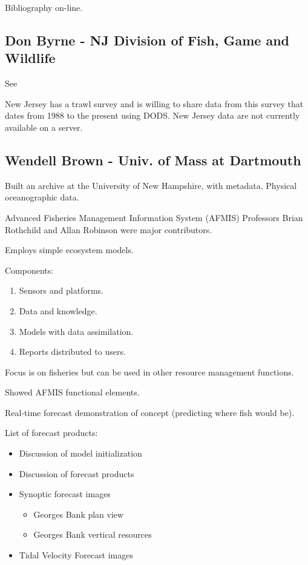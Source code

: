 Bibliography on-line.

\subsection{Don Byrne - NJ Division of Fish, Game and Wildlife}

See 

New Jersey has a trawl survey and is willing to share data from this
survey that dates from 1988 to the present using DODS.  New Jersey
data are not currently available on a server.


\subsection{Wendell Brown - Univ. of Mass at Dartmouth}

Built an archive at the University of New Hampshire, with metadata.
Physical oceanographic data.

Advanced Fisheries Management Information System (AFMIS)
Professors Brian Rothchild and Allan Robinson were major contributors.

Employs simple ecosystem models.

Components:
\begin{enumerate}
\item Sensors and platforms.
\item Data and knowledge.
\item Models with data assimilation.
\item Reports distributed to users.
\end{enumerate}

Focus is on fisheries but can be used in other resource management functions.

Showed AFMIS functional elements.

Real-time forecast demonstration of concept (predicting where fish would be).

List of forecast products:
\begin{itemize}
\item Discussion of model initialization
\item Discussion of forecast products
\item Synoptic forecast images
  \begin{itemize}
  \item Georges Bank plan view
  \item Georges Bank vertical resources
  \end{itemize}
\item Tidal Velocity Forecast images
\end{itemize}

